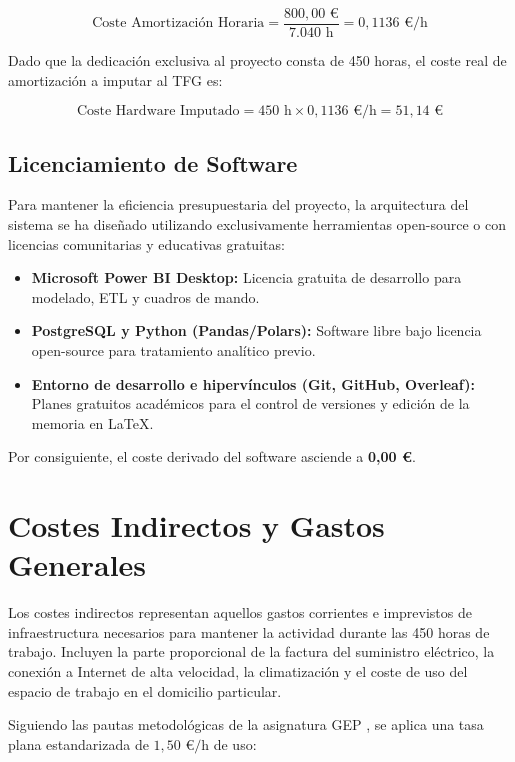 \documentclass[12pt, a4paper, twoside]{report}
\begin{document}
\begin{equation}
\text{Coste Amortización Horaria} = \frac{800,00 \text{ €}}{7.040 \text{ h}} = 0,1136 \text{ €/h}
\end{equation}

Dado que la dedicación exclusiva al proyecto consta de 450 horas, el coste real de amortización a imputar al TFG es:

\begin{equation}
\text{Coste Hardware Imputado} = 450 \text{ h} \times 0,1136 \text{ €/h} = 51,14 \text{ €}
\end{equation}

\subsection{Licenciamiento de Software}
Para mantener la eficiencia presupuestaria del proyecto, la arquitectura del sistema se ha diseñado utilizando exclusivamente herramientas open-source o con licencias comunitarias y educativas gratuitas:
\begin{itemize}
    \item \textbf{Microsoft Power BI Desktop:} Licencia gratuita de desarrollo para modelado, ETL y cuadros de mando.
    \item \textbf{PostgreSQL y Python (Pandas/Polars):} Software libre bajo licencia open-source para tratamiento analítico previo.
    \item \textbf{Entorno de desarrollo e hipervínculos (Git, GitHub, Overleaf):} Planes gratuitos académicos para el control de versiones y edición de la memoria en \LaTeX.
\end{itemize}
Por consiguiente, el coste derivado del software asciende a \textbf{0,00 €}.

\section{Costes Indirectos y Gastos Generales}
Los costes indirectos representan aquellos gastos corrientes e imprevistos de infraestructura necesarios para mantener la actividad durante las 450 horas de trabajo. Incluyen la parte proporcional de la factura del suministro eléctrico, la conexión a Internet de alta velocidad, la climatización y el coste de uso del espacio de trabajo en el domicilio particular.

Siguiendo las pautas metodológicas de la asignatura GEP \cite{fib_costos}, se aplica una tasa plana estandarizada de $1,50 \text{ €/h}$ de uso:
\end{document}
